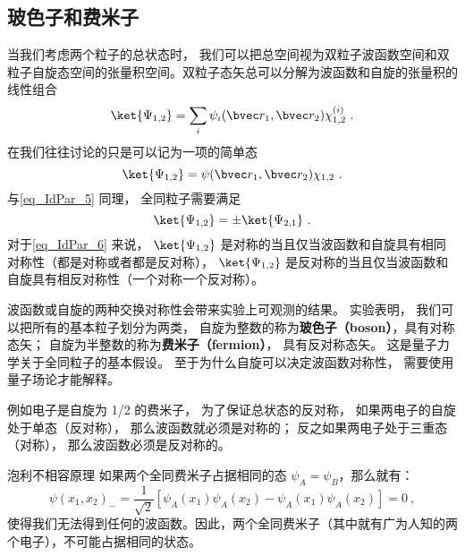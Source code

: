 \subsection{玻色子和费米子}
当我们考虑两个粒子的总状态时， 我们可以把总空间视为双粒子波函数空间和双粒子自旋态空间的张量积空间。双粒子态矢总可以分解为波函数和自旋的张量积的线性组合 %
\begin{equation}
\ket{\Psi_{1,2}} = \sum_i \psi_i(\bvec r_1, \bvec r_2) \chi^{(i)}_{1,2}~.
\end{equation}
在我们往往讨论的只是可以记为一项的简单态
\begin{equation}\label{eq_IdPar_6}
\ket{\Psi_{1,2}} = \psi(\bvec r_1, \bvec r_2) \chi_{1,2}~.
\end{equation}
与\autoref{eq_IdPar_5} 同理， 全同粒子需要满足
\begin{equation}\label{eq_IdPar_4}
\ket{\Psi_{1,2}} = \pm \ket{\Psi_{2,1}}~.
\end{equation}
对于\autoref{eq_IdPar_6} 来说， $\ket{\Psi_{1,2}}$ 是对称的当且仅当波函数和自旋具有相同对称性（都是对称或者都是反对称）， $\ket{\Psi_{1,2}}$ 是反对称的当且仅当波函数和自旋具有相反对称性（一个对称一个反对称）。

波函数或自旋的两种交换对称性会带来实验上可观测的结果。 实验表明， 我们可以把所有的基本粒子划分为两类， 自旋为整数的称为\textbf{玻色子（boson）}，具有对称态矢； 自旋为半整数的称为\textbf{费米子（fermion）}， 具有反对称态矢。 这是量子力学关于全同粒子的基本假设。 至于为什么自旋可以决定波函数对称性， 需要使用量子场论才能解释。 %

例如电子是自旋为 1/2 的费米子， 为了保证总状态的反对称， 如果两电子的自旋处于单态（反对称）， 那么波函数就必须是对称的； 反之如果两电子处于三重态（对称）， 那么波函数必须是反对称的。

\begin{corollary}{泡利不相容原理}
如果两个全同费米子占据相同的态 $\psi_A=\psi_B$，那么就有：
\begin{equation}
\psi(x_1,x_2)_-=\frac{1}{\sqrt{2}}[\psi_A(x_1)\psi_A(x_2)-\psi_A(x_1)\psi_A(x_2)]=0~,
\end{equation}
使得我们无法得到任何的波函数。因此，两个全同费米子（其中就有广为人知的两个电子），不可能占据相同的状态。
\end{corollary}

